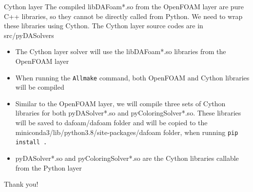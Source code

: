 \documentclass{bredelebeamer}
\begin{document}
\begin{frame}[fragile]{Cython layer}
The compiled libDAFoam*.so from the OpenFOAM layer are pure C++ libraries, so they cannot be directly called from Python. We need to wrap these libraries using Cython. The Cython layer source codes are in src/pyDASolvers
  \begin{itemize}
    \setlength\itemsep{1em}
    \item The Cython layer solver will use the libDAFoam*.so libraries from the OpenFOAM layer
    \item When running the \texttt{Allmake} command, both OpenFOAM and Cython libraries will be compiled
    \item Similar to the OpenFOAM layer, we will compile three sets of Cython libraries for both pyDASolver*.so and pyColoringSolver*.so. These libraries will be saved to dafoam/dafoam folder and will be copied to the miniconda3/lib/python3.8/site-packages/dafoam folder, when running \texttt{pip install .}
    \item pyDASolver*.so and pyColoringSolver*.so are the Cython libraries callable from the Python layer
    
  \end{itemize}
\end{frame}

\begin{frame}[plain]{}
  \Huge \centering
  Thank you!
\end{frame}
\end{document}
